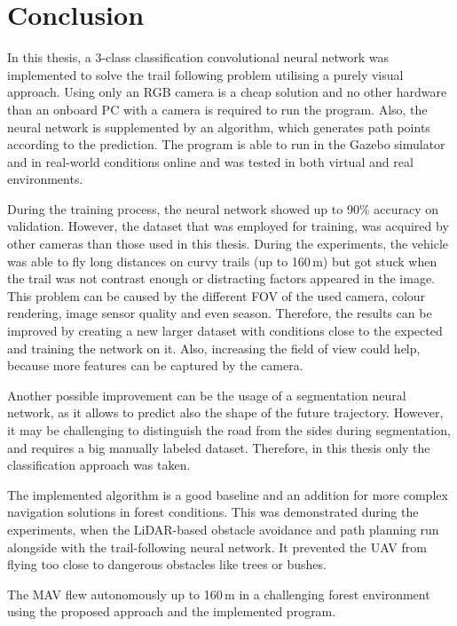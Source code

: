 \chapter{Conclusion}


In this thesis, a 3-class classification convolutional neural network was implemented to solve the trail following problem utilising a purely visual approach. Using only an RGB camera is a cheap solution and no other hardware than an onboard PC with a camera is required to run the program. Also, the neural network is supplemented by an algorithm, which generates path points according to the prediction. The program is able to run in the Gazebo simulator and in real-world conditions online and was tested in both virtual and real environments.

During the training process, the neural network showed up to 90\% accuracy on validation. However, the dataset that was employed for training, was acquired by other cameras than those used in this thesis. During the experiments, the vehicle was able to fly long distances on curvy trails (up to 160\,m) but got stuck when the trail was not contrast enough or distracting factors appeared in the image. This problem can be caused by the different \acs{FOV} of the used camera, colour rendering, image sensor quality and even season. Therefore, the results can be improved by creating a new larger dataset with conditions close to the expected and training the network on it. Also, increasing the field of view could help, because more features can be captured by the camera.

Another possible improvement can be the usage of a segmentation neural network, as it allows to predict also the shape of the future trajectory. However, it may be challenging to distinguish the road from the sides during segmentation, and requires a big manually labeled dataset. Therefore, in this thesis only the classification approach was taken.

The implemented algorithm is a good baseline and an addition for more complex navigation solutions in forest conditions. This was demonstrated during the experiments, when the \acs{LiDAR}-based obstacle avoidance and path planning run alongside with the trail-following neural network. It prevented the \acs{UAV} from flying too close to dangerous obstacles like trees or bushes.

The \acs{MAV} flew autonomously up to 160\,m in a challenging forest environment using the proposed approach and the implemented program.


